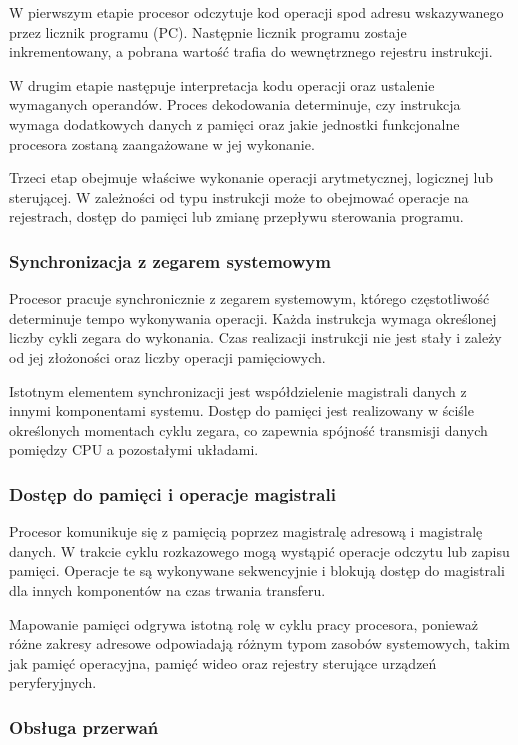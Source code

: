 \documentclass{article}
\begin{document}
W pierwszym etapie procesor odczytuje kod operacji spod adresu wskazywanego przez licznik programu (PC). Następnie licznik programu zostaje inkrementowany, a pobrana wartość trafia do wewnętrznego rejestru instrukcji.

W drugim etapie następuje interpretacja kodu operacji oraz ustalenie wymaganych operandów. Proces dekodowania determinuje, czy instrukcja wymaga dodatkowych danych z pamięci oraz jakie jednostki funkcjonalne procesora zostaną zaangażowane w jej wykonanie.

Trzeci etap obejmuje właściwe wykonanie operacji arytmetycznej, logicznej lub sterującej. W zależności od typu instrukcji może to obejmować operacje na rejestrach, dostęp do pamięci lub zmianę przepływu sterowania programu.

\subsubsection{Synchronizacja z zegarem systemowym}

Procesor pracuje synchronicznie z zegarem systemowym, którego częstotliwość determinuje tempo wykonywania operacji. Każda instrukcja wymaga określonej liczby cykli zegara do wykonania. Czas realizacji instrukcji nie jest stały i zależy od jej złożoności oraz liczby operacji pamięciowych.

Istotnym elementem synchronizacji jest współdzielenie magistrali danych z innymi komponentami systemu. Dostęp do pamięci jest realizowany w ściśle określonych momentach cyklu zegara, co zapewnia spójność transmisji danych pomiędzy CPU a pozostałymi układami.

\subsubsection{Dostęp do pamięci i operacje magistrali}

Procesor komunikuje się z pamięcią poprzez magistralę adresową i magistralę danych. W trakcie cyklu rozkazowego mogą wystąpić operacje odczytu lub zapisu pamięci. Operacje te są wykonywane sekwencyjnie i blokują dostęp do magistrali dla innych komponentów na czas trwania transferu.

Mapowanie pamięci odgrywa istotną rolę w cyklu pracy procesora, ponieważ różne zakresy adresowe odpowiadają różnym typom zasobów systemowych, takim jak pamięć operacyjna, pamięć wideo oraz rejestry sterujące urządzeń peryferyjnych.

\subsubsection{Obsługa przerwań}
\end{document}
